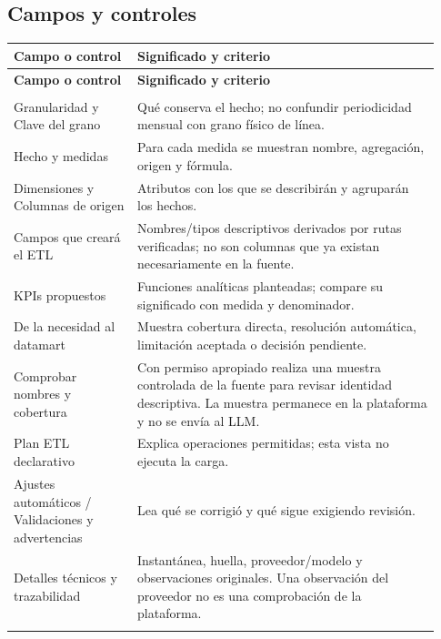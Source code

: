 \subsection{Campos y controles}
\begingroup
\fontsize{10}{12.5}\selectfont
\setlength{\tabcolsep}{5pt}
\renewcommand{\arraystretch}{1.15}
\begin{longtable}{@{}>{\RaggedRight\arraybackslash}p{0.27\linewidth}>{\RaggedRight\arraybackslash}p{0.66\linewidth}@{}}
\toprule
\textbf{Campo o control} & \textbf{Significado y criterio} \\
\midrule
\endfirsthead
\toprule
\textbf{Campo o control} & \textbf{Significado y criterio} \\
\midrule
\endhead
\midrule
\multicolumn{2}{r}{\footnotesize Continúa en la página siguiente}\\
\endfoot
\bottomrule
\endlastfoot
Granularidad y Clave del grano & Qué conserva el hecho; no confundir periodicidad mensual con grano físico de línea. \\
\addlinespace[3pt]
Hecho y medidas & Para cada medida se muestran nombre, agregación, origen y fórmula. \\
\addlinespace[3pt]
Dimensiones y Columnas de origen & Atributos con los que se describirán y agruparán los hechos. \\
\addlinespace[3pt]
Campos que creará el ETL & Nombres/tipos descriptivos derivados por rutas verificadas; no son columnas que ya existan necesariamente en la fuente. \\
\addlinespace[3pt]
KPIs propuestos & Funciones analíticas planteadas; compare su significado con medida y denominador. \\
\addlinespace[3pt]
De la necesidad al datamart & Muestra cobertura directa, resolución automática, limitación aceptada o decisión pendiente. \\
\addlinespace[3pt]
Comprobar nombres y cobertura & Con permiso apropiado realiza una muestra controlada de la fuente para revisar identidad descriptiva. La muestra permanece en la plataforma y no se envía al LLM. \\
\addlinespace[3pt]
Plan ETL declarativo & Explica operaciones permitidas; esta vista no ejecuta la carga. \\
\addlinespace[3pt]
Ajustes automáticos / Validaciones y advertencias & Lea qué se corrigió y qué sigue exigiendo revisión. \\
\addlinespace[3pt]
Detalles técnicos y trazabilidad & Instantánea, huella, proveedor/modelo y observaciones originales. Una observación del proveedor no es una comprobación de la plataforma. \\
\addlinespace[3pt]
\end{longtable}
\endgroup

